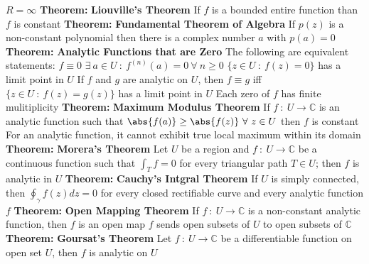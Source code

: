 \documentclass[14pt]{extarticle}
\def\Theorem{{\color{red} \textbf{Theorem:} }}
\begin{document}
\begin{outline}
		\2	$R = \infty$
	\1	\Theorem \textbf{Liouville's Theorem}
		\2	If $f$ is a bounded entire function than $f$ is constant
	\1	\Theorem \textbf{Fundamental Theorem of Algebra}
		\2	If $p(z)$ is a non-constant polynomial then there is a complex number
				$a$ with $p(a) = 0$
	\1	\Theorem	\textbf{Analytic Functions that are Zero}
		\2	The following are equivalent statements:
			\3	$f \equiv 0$
			\3	$\exists~a \in U~:~f^{(n)}(a) = 0~\forall~n \ge 0$
			\3	$\{z \in U~:~f(z) = 0\}$ has a limit point in $U$
		\2	If $f$ and $g$ are analytic on $U$, then $f \equiv g$ iff
				$\{z\in U~:~f(z) = g(z)\}$ has a limit point in $U$
		\2	Each zero of $f$ has finite mulitiplicity
	\1	\Theorem	\textbf{Maximum Modulus Theorem}
		\2	If $f~:~U \rightarrow \mathbb{C}$ is an analytic function such that
				$\abs{f(a)} \ge \abs{f(z)}~\forall~z \in U$ then $f$ is constant
		\2	For an analytic function, it cannot exhibit true local maximum within
				its domain
	\1	\Theorem	\textbf{Morera's Theorem}
		\2	Let $U$ be a region and $f~:~U \rightarrow \mathbb{C}$ be a continuous
				function such that $\int_T f = 0$ for every triangular path $T \in U$;
				then $f$ is analytic in $U$
	\1	\Theorem	\textbf{Cauchy's Intgral Theorem}
		\2	If $U$ is simply connected, then $\oint_{\gamma} f(z) dz = 0$ for every closed
				rectifiable curve and every analytic function $f$
	\1	\Theorem	\textbf{Open Mapping Theorem}
		\2	If $f~:~U \rightarrow \mathbb{C}$ is a non-constant analytic function,
				then $f$ is an open map
		\2	$f$ sends open subsets of $U$ to open subsets of $\mathbb{C}$
	\1	\Theorem	\textbf{Goursat's Theorem}
		\2	Let $f~:~U \rightarrow \mathbb{C}$ be a differentiable function on open
				set $U$, then $f$ is analytic on $U$

\end{outline}
\end{document}
